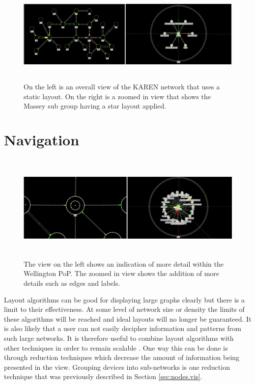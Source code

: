 \documentclass[11pt, a4paper]{report}
\begin{document}
\begin{figure}
\centering
\includegraphics[width=170mm,height=49.34mm]{assets/layouts1-1.eps}
\caption{On the left is an overall view of the KAREN network that uses a static
layout. On the right is a zoomed in view that shows the Massey sub group having 
a star layout applied.}
\label{fig:layouts1.1}
\end{figure}


\section{Navigation}
\label{sec:navigation.vis}

\begin{figure}[h]
\centering
\includegraphics[width=170mm,height=53mm]{assets/nav1-0.eps}
\caption{The view on the left shows an indication of more detail within the
Wellington PoP. The zoomed in view shows the addition of more details such 
as edges and labels.}
\label{fig:nav1.0}
\end{figure}

Layout algorithms can be good for displaying large graphs clearly but there is a
limit to their effectiveness. At some level of network size or density the
limits of these algorithms will be reached and ideal layouts will no longer be
guaranteed. It is also likely that a user can not easily decipher information
and patterns from such large networks. It is therefore useful to combine layout
algorithms with other techniques in order to remain scalable \cite{Herman_2000}.
One way this can be done is through reduction techniques which decrease the
amount of information being presented in the view. Grouping devices into
sub-networks is one reduction technique that was previously described in Section
\ref{sec:nodes.vis}. 
\end{document}
